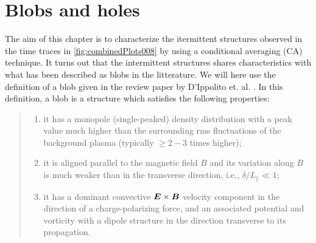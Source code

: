 \section{Blobs and holes}
%
The aim of this chapter is to characterize the itermittent structures observed in the time traces in \cref{fig:combinedPlots008} by using a conditional averaging (CA) technique.
It turns out that the intermittent structures shares characteristics with what has been described as blobs in the litterature.
We will here use the definition of a blob given in the review paper by D'Ippolito et. al. \cite{DIppolito2011}.
In this definition, a blob is a structure which satisfies the following properties:
%
\begin{quote}
    \begin{enumerate}[noitemsep]
            \item  it has a monopole (single-peaked) density distribution with a peak value much higher than the surrounding rms fluctuations of the background plasma (typically $\geq 2-3$ times higher);
            \item  it is aligned parallel to the magnetic field $B$ and its variation along $B$ is much weaker than in the transverse direction, i.e., $\delta/L_\|\ll1$;
            \item it has a dominant convective $\boldsymbol{E}\times\boldsymbol{B}$ velocity component in the direction of a charge-polarizing force, and an associated potential and vorticity with a dipole structure in the direction transverse to its propagation.
    \end{enumerate}
\end{quote}
%


